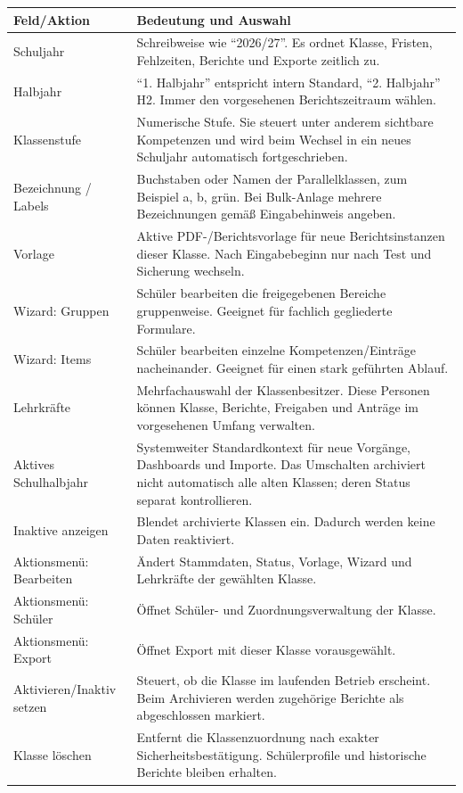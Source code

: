 \documentclass[12pt,a4paper]{article}
\begin{document}
\small
\begin{longtable}{|p{}|p{}|}
\hline
\textbf{Feld/Aktion} & \textbf{Bedeutung und Auswahl}\\
\hline
Schuljahr & Schreibweise wie \enquote{2026/27}. Es ordnet Klasse, Fristen, Fehlzeiten, Berichte und Exporte zeitlich zu.\\
\hline
Halbjahr & \enquote{1. Halbjahr} entspricht intern Standard, \enquote{2. Halbjahr} H2. Immer den vorgesehenen Berichtszeitraum wählen.\\
\hline
Klassenstufe & Numerische Stufe. Sie steuert unter anderem sichtbare Kompetenzen und wird beim Wechsel in ein neues Schuljahr automatisch fortgeschrieben.\\
\hline
Bezeichnung / Labels & Buchstaben oder Namen der Parallelklassen, zum Beispiel a, b, grün. Bei Bulk-Anlage mehrere Bezeichnungen gemäß Eingabehinweis angeben.\\
\hline
Vorlage & Aktive PDF-/Berichtsvorlage für neue Berichtsinstanzen dieser Klasse. Nach Eingabebeginn nur nach Test und Sicherung wechseln.\\
\hline
Wizard: Gruppen & Schüler bearbeiten die freigegebenen Bereiche gruppenweise. Geeignet für fachlich gegliederte Formulare.\\
\hline
Wizard: Items & Schüler bearbeiten einzelne Kompetenzen/Einträge nacheinander. Geeignet für einen stark geführten Ablauf.\\
\hline
Lehrkräfte & Mehrfachauswahl der Klassenbesitzer. Diese Personen können Klasse, Berichte, Freigaben und Anträge im vorgesehenen Umfang verwalten.\\
\hline
Aktives Schulhalbjahr & Systemweiter Standardkontext für neue Vorgänge, Dashboards und Importe. Das Umschalten archiviert nicht automatisch alle alten Klassen; deren Status separat kontrollieren.\\
\hline
Inaktive anzeigen & Blendet archivierte Klassen ein. Dadurch werden keine Daten reaktiviert.\\
\hline
Aktionsmenü: Bearbeiten & Ändert Stammdaten, Status, Vorlage, Wizard und Lehrkräfte der gewählten Klasse.\\
\hline
Aktionsmenü: Schüler & Öffnet Schüler- und Zuordnungsverwaltung der Klasse.\\
\hline
Aktionsmenü: Export & Öffnet Export mit dieser Klasse vorausgewählt.\\
\hline
Aktivieren/Inaktiv setzen & Steuert, ob die Klasse im laufenden Betrieb erscheint. Beim Archivieren werden zugehörige Berichte als abgeschlossen markiert.\\
\hline
Klasse löschen & Entfernt die Klassenzuordnung nach exakter Sicherheitsbestätigung. Schülerprofile und historische Berichte bleiben erhalten.\\
\hline
\end{longtable}
\normalsize
\end{document}
